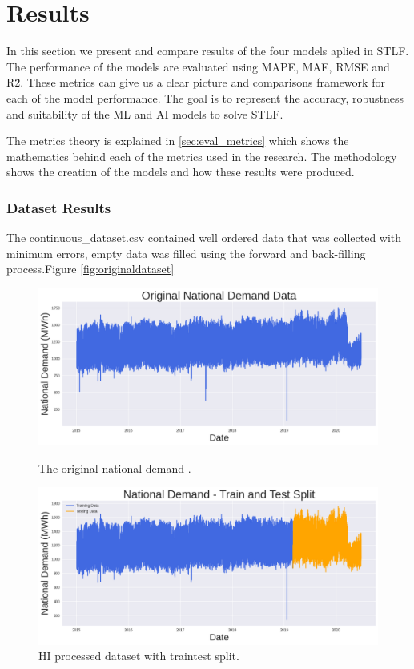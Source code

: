 \chapter{Results}
In this section we present and compare results of the four models aplied in STLF. The performance of the models are evaluated using MAPE, MAE, RMSE and R\^2. These metrics can give us a clear picture and comparisons framework for each of the model performance.  The goal is to represent the accuracy, robustness and suitability of the ML and AI models to solve STLF.

The metrics theory is explained in \ref{sec:eval_metrics} which shows the mathematics behind each of the metrics used in the research. The methodology shows the creation of the models and how these results were produced. 


\subsection{Dataset Results}
 The continuous\_dataset.csv contained well ordered data that was collected with minimum errors, empty data was filled using the forward and back-filling process.Figure \ref{fig:originaldataset}
 \begin{figure}[h]
 	\centering
 \begin{minipage}[b]{0.45\linewidth}
 	\centering
 	\includegraphics[width=\linewidth]{Chapters/images/results/original_dataset}
 	\caption{The original national demand .}
 	\label{fig:originaldataset}
 \end{minipage}
 \begin{minipage}[b]{0.45\linewidth}
 	\centering
 	\includegraphics[width=\linewidth]{"Chapters/images/results/train test split_after HI"}
 	\caption{HI processed dataset with traintest split.}
 	\label{fig:train-test-splitafter-hi}
 \end{minipage}
 \end{figure}
 
